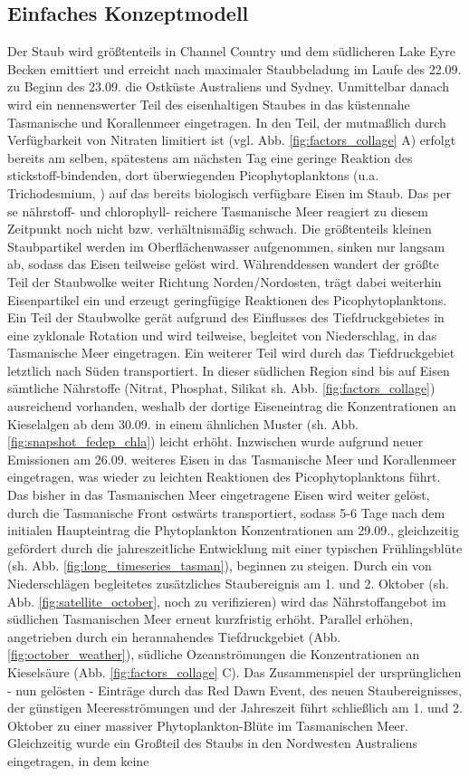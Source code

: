 \documentclass[12pt,a4paper,onecolumn,headheight=30pt]{scrartcl}
\begin{document}
\subsection{Einfaches Konzeptmodell}
Der Staub wird größtenteils in Channel Country und dem südlicheren Lake Eyre Becken emittiert und erreicht nach maximaler Staubbeladung im Laufe des 22.09. zu Beginn des 23.09. die Ostküste Australiens und Sydney. Unmittelbar danach wird ein nennenswerter Teil des eisenhaltigen Staubes in das küstennahe Tasmanische und Korallenmeer eingetragen. In den Teil, der mutmaßlich durch Verfügbarkeit von  Nitraten limitiert ist (vgl. Abb. \ref{fig:factors_collage} A) erfolgt bereits am selben, spätestens am nächsten Tag eine geringe Reaktion des stickstoff-bindenden, dort überwiegenden Picophytoplanktons (u.a. Trichodesmium, \cite{Rubin.2011}) auf das bereits biologisch verfügbare Eisen im Staub. Das per se nährstoff- und chlorophyll- reichere Tasmanische Meer reagiert zu diesem Zeitpunkt noch nicht bzw. verhältnismäßig schwach. Die größtenteils kleinen Staubpartikel werden im Oberflächenwasser aufgenommen, sinken nur langsam ab, sodass das Eisen teilweise gelöst wird. Währenddessen wandert der größte Teil der Staubwolke weiter Richtung Norden/Nordosten, trägt dabei weiterhin Eisenpartikel ein und erzeugt geringfügige Reaktionen des Picophytoplanktons. Ein Teil der Staubwolke gerät aufgrund des Einflusses des Tiefdruckgebietes in eine zyklonale Rotation und wird teilweise, begleitet von Niederschlag, in das Tasmanische Meer eingetragen. Ein weiterer Teil wird durch das Tiefdruckgebiet letztlich nach Süden transportiert. In dieser südlichen Region sind bis auf Eisen sämtliche Nährstoffe (Nitrat, Phosphat, Silikat sh. Abb. \ref{fig:factors_collage}) ausreichend vorhanden, weshalb der dortige Eiseneintrag die Konzentrationen an Kieselalgen ab dem 30.09. in einem ähnlichen Muster (sh. Abb. \ref{fig:snapshot_fedep_chla}) leicht erhöht. Inzwischen wurde aufgrund neuer Emissionen am 26.09. weiteres Eisen in das Tasmanische Meer und Korallenmeer eingetragen, was wieder zu leichten Reaktionen des Picophytoplanktons führt. Das bisher in das Tasmanischen Meer eingetragene Eisen wird weiter gelöst, durch die Tasmanische Front ostwärts transportiert, sodass 5-6 Tage nach dem initialen Haupteintrag die Phytoplankton Konzentrationen am 29.09., gleichzeitig gefördert durch die jahreszeitliche Entwicklung mit einer typischen Frühlingsblüte (sh. Abb. \ref{fig:long_timeseries_tasman}), beginnen zu steigen. Durch ein von Niederschlägen begleitetes zusätzliches Staubereignis am 1. und 2. Oktober (sh. Abb. \ref{fig:satellite_october}, noch zu verifizieren) wird das Nährstoffangebot im südlichen Tasmanischen Meer erneut kurzfristig erhöht. Parallel erhöhen, angetrieben durch ein herannahendes Tiefdruckgebiet (Abb. \ref{fig:october_weather}), südliche Ozeanströmungen die Konzentrationen an Kieselsäure (Abb. \ref{fig:factors_collage} C). Das Zusammenspiel der ursprünglichen - nun gelösten - Einträge durch das Red Dawn Event, des neuen Staubereignisses, der günstigen Meeresströmungen und der Jahreszeit führt schließlich am 1. und 2. Oktober zu einer massiver Phytoplankton-Blüte im Tasmanischen Meer. Gleichzeitig wurde ein Großteil des Staubs in den Nordwesten Australiens eingetragen, in dem keine 
\end{document}
